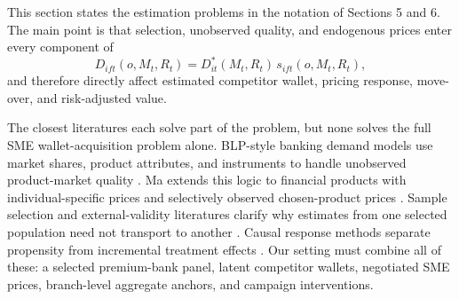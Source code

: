 \documentclass[11pt]{article}
\begin{document}
This section states the estimation problems in the notation of Sections 5 and
6. The main point is that selection, unobserved quality, and endogenous prices
enter every component of
\[
  D_{ift}(o,M_t,R_t)
  =
  D_{it}^{*}(M_t,R_t)\,s_{ift}(o,M_t,R_t),
\]
and therefore directly affect estimated competitor wallet, pricing response,
move-over, and risk-adjusted value.

The closest literatures each solve part of the problem, but none solves the
full SME wallet-acquisition problem alone. BLP-style banking demand models use
market shares, product attributes, and instruments to handle unobserved
product-market quality \citep{berry1995automobile,dick2008demand,nevo2001cereal}.
Ma extends this logic to financial products with individual-specific prices and
selectively observed chosen-product prices \citep{ma2024discrete}. Sample
selection and external-validity literatures clarify why estimates from one
selected population need not transport to another
\citep{heckman1979selection,hotz2005predicting,manski1990bounds}. Causal
response methods separate propensity from incremental treatment effects
\citep{rosenbaum1983propensity,wager2018causalforests,chernozhukov2018dml}.
Our setting must combine all of these: a selected premium-bank panel, latent
competitor wallets, negotiated SME prices, branch-level aggregate anchors, and
campaign interventions.
\end{document}
